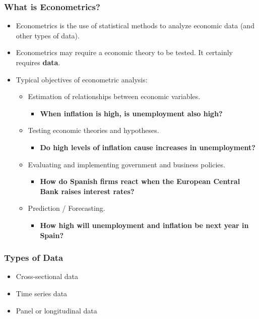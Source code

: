 \documentclass[aspectratio=169]{beamer}
\begin{document}
\begin{frame}
    \frametitle{What is Econometrics?}
    \begin{itemize}
        \item Econometrics is the use of statistical methods to analyze economic data (and other types of data).
        \item Econometrics may require a economic theory to be tested. It certainly requires \textbf{data}.
    
    \item Typical objectives of econometric analysis:
\medskip
    \begin{itemize}
        \item Estimation of relationships between economic variables.
        \begin{itemize}
            \item \textbf{When inflation is high, is unemployment also high?}
        \end{itemize}
        \item Testing economic theories and hypotheses.
        \begin{itemize}
            \item \textbf{Do high levels of inflation cause increases in unemployment?}
        \end{itemize}
        \item Evaluating and implementing government and business policies.
        \begin{itemize}
            \item \textbf{How do Spanish firms react when the European Central Bank raises interest rates?}
        \end{itemize}
        \item Prediction / Forecasting.
        \begin{itemize}
            \item \textbf{How high will unemployment and inflation be next year in Spain?}
        \end{itemize}
    \end{itemize}
    \end{itemize}
\end{frame}


\begin{frame}
    \frametitle{Types of Data}
    \begin{itemize}
        \item Cross-sectional data\medskip
        \item Time series data\medskip
        \item Panel or longitudinal data
    \end{itemize}
\end{frame}
\end{document}
